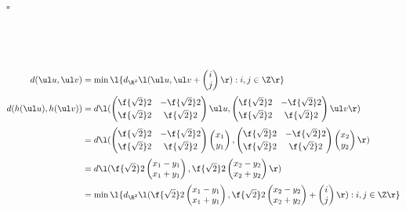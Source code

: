 \documentclass[a4paper]{article}
\begin{document}
\hfill $\square$

\subsection{~} %

\begin{align*}
d(\ul u, \ul v) &= \min\l\{ d_{\R^2} \l( \ul u, \ul v + \begin{pmatrix} i \\ j \end{pmatrix} \r)
    : i, j \in \Z \r\} \\[0.5ex]
%
d(h(\ul u), h(\ul v)) &= d \l(
    \begin{pmatrix} \f{\sqrt 2}2 & -\f{\sqrt 2}2 \\[0.5ex] \f{\sqrt 2}2 & \f{\sqrt 2}2 \end{pmatrix} \ul u,
    \begin{pmatrix} \f{\sqrt 2}2 & -\f{\sqrt 2}2 \\[0.5ex] \f{\sqrt 2}2 & \f{\sqrt 2}2 \end{pmatrix} \ul v
\r) \\[0.5ex]
%
&= d \l(
    \begin{pmatrix} \f{\sqrt 2}2 & -\f{\sqrt 2}2 \\[0.5ex] \f{\sqrt 2}2 & \f{\sqrt 2}2 \end{pmatrix}
    \begin{pmatrix} x_1 \\ y_1 \end{pmatrix},
    \begin{pmatrix} \f{\sqrt 2}2 & -\f{\sqrt 2}2 \\[0.5ex] \f{\sqrt 2}2 & \f{\sqrt 2}2 \end{pmatrix}
    \begin{pmatrix} x_2 \\ y_2 \end{pmatrix}
\r) \\[0.5ex]
%
&= d \l(
    \f{\sqrt 2}2 \begin{pmatrix} x_1 - y_1 \\ x_1 + y_1 \end{pmatrix},
    \f{\sqrt 2}2 \begin{pmatrix} x_2 - y_2 \\ x_2 + y_2 \end{pmatrix}
\r) \\[0.5ex]
%
&= \min\l\{ d_{\R^2} \l(
    \f{\sqrt 2}2 \begin{pmatrix} x_1 - y_1 \\ x_1 + y_1 \end{pmatrix},
    \f{\sqrt 2}2 \begin{pmatrix} x_2 - y_2 \\ x_2 + y_2 \end{pmatrix} + \begin{pmatrix} i \\ j \end{pmatrix}
\r) : i, j \in \Z \r\}
\end{align*}
\end{document}

